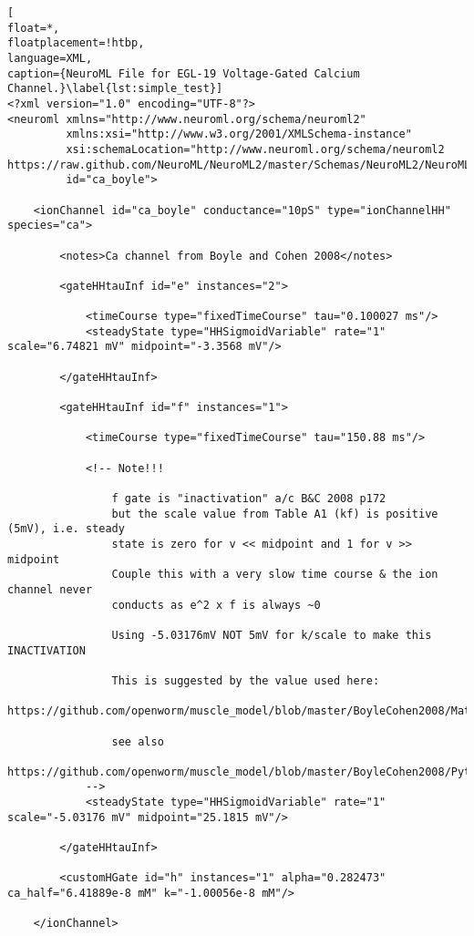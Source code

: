 \documentclass[10pt,a4paper]{article}
\begin{document}
\begin{lstlisting}[
float=*,
floatplacement=!htbp,
language=XML,
caption={NeuroML File for EGL-19 Voltage-Gated Calcium Channel.}\label{lst:simple_test}]
<?xml version="1.0" encoding="UTF-8"?>
<neuroml xmlns="http://www.neuroml.org/schema/neuroml2"
         xmlns:xsi="http://www.w3.org/2001/XMLSchema-instance"
         xsi:schemaLocation="http://www.neuroml.org/schema/neuroml2  https://raw.github.com/NeuroML/NeuroML2/master/Schemas/NeuroML2/NeuroML_v2beta.xsd"
         id="ca_boyle">

    <ionChannel id="ca_boyle" conductance="10pS" type="ionChannelHH" species="ca">

        <notes>Ca channel from Boyle and Cohen 2008</notes>

        <gateHHtauInf id="e" instances="2">

            <timeCourse type="fixedTimeCourse" tau="0.100027 ms"/>
            <steadyState type="HHSigmoidVariable" rate="1" scale="6.74821 mV" midpoint="-3.3568 mV"/>

        </gateHHtauInf>

        <gateHHtauInf id="f" instances="1">

            <timeCourse type="fixedTimeCourse" tau="150.88 ms"/>
            
            <!-- Note!!! 

                f gate is "inactivation" a/c B&C 2008 p172 
                but the scale value from Table A1 (kf) is positive (5mV), i.e. steady 
                state is zero for v << midpoint and 1 for v >> midpoint 
                Couple this with a very slow time course & the ion channel never 
                conducts as e^2 x f is always ~0 

                Using -5.03176mV NOT 5mV for k/scale to make this INACTIVATION 
                
                This is suggested by the value used here:
                https://github.com/openworm/muscle_model/blob/master/BoyleCohen2008/MatlabSupport/Main_Version/data/input.csv#L20
                
                see also
                https://github.com/openworm/muscle_model/blob/master/BoyleCohen2008/PythonSupport/Main_Version/compareToNeuroML2.py
            -->
            <steadyState type="HHSigmoidVariable" rate="1" scale="-5.03176 mV" midpoint="25.1815 mV"/>

        </gateHHtauInf>

        <customHGate id="h" instances="1" alpha="0.282473" ca_half="6.41889e-8 mM" k="-1.00056e-8 mM"/>

    </ionChannel>
\end{lstlisting}
\end{document}
